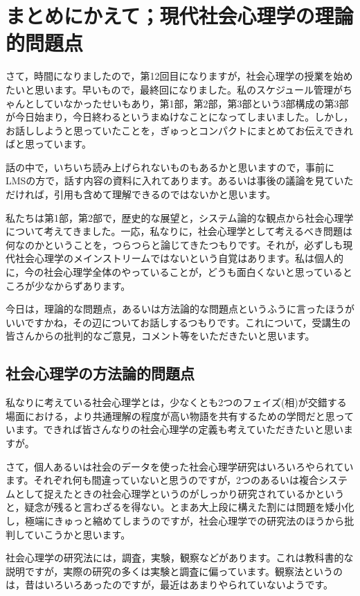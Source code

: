 \documentclass{ltjsbook}
\begin{document}
\setcounter{chapter}{11}
\chapter{まとめにかえて；現代社会心理学の理論的問題点}
\label{sp12_scaling}
さて，時間になりましたので，第12回目になりますが，社会心理学の授業を始めたいと思います。早いもので，最終回になりました。私のスケジュール管理がちゃんとしていなかったせいもあり，第1部，第2部，第3部という3部構成の第3部が今日始まり，今日終わるというまぬけなことになってしまいました。しかし，お話ししようと思っていたことを，ぎゅっとコンパクトにまとめてお伝えできればと思っています。

話の中で，いちいち読み上げられないものもあるかと思いますので，事前にLMSの方で，話す内容の資料に入れてあります。あるいは事後の議論を見ていただければ，引用も含めて理解できるのではないかと思います。

私たちは第1部，第2部で，歴史的な展望と，システム論的な観点から社会心理学について考えてきました。一応，私なりに，社会心理学として考えるべき問題は何なのかということを，つらつらと論じてきたつもりです。それが，必ずしも現代社会心理学のメインストリームではないという自覚はあります。私は個人的に，今の社会心理学全体のやっていることが，どうも面白くないと思っているところが少なからずあります。

今日は，理論的な問題点，あるいは方法論的な問題点というふうに言ったほうがいいですかね，その辺についてお話しするつもりです。これについて，受講生の皆さんからの批判的なご意見，コメント等をいただきたいと思います。

\section{社会心理学の方法論的問題点}

私なりに考えている社会心理学とは，少なくとも2つのフェイズ(相)が交錯する場面における，より共通理解の程度が高い物語を共有するための学問だと思っています。できれば皆さんなりの社会心理学の定義も考えていただきたいと思いますが。

さて，個人あるいは社会のデータを使った社会心理学研究はいろいろやられています。それぞれ何も間違っていないと思うのですが，2つのあるいは複合システムとして捉えたときの社会心理学というのがしっかり研究されているかというと，疑念が残ると言わざるを得ない。とまあ大上段に構えた割には問題を矮小化し，極端にきゅっと縮めてしまうのですが，社会心理学での研究法のほうから批判していこうかと思います。

社会心理学の研究法には，調査，実験，観察などがあります。これは教科書的な説明ですが，実際の研究の多くは実験と調査に偏っています。観察法というのは，昔はいろいろあったのですが，最近はあまりやられていないようです。
\end{document}
